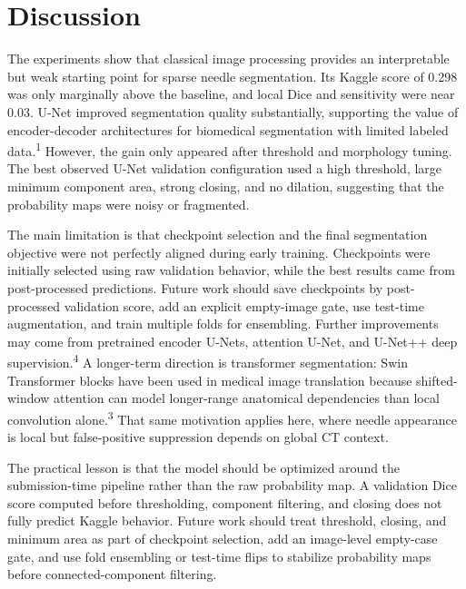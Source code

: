 \documentclass[10pt]{article}
\begin{document}
\section{Discussion}
The experiments show that classical image processing provides an interpretable but weak starting point for sparse needle segmentation. Its Kaggle score of 0.298 was only marginally above the baseline, and local Dice and sensitivity were near 0.03. U-Net improved segmentation quality substantially, supporting the value of encoder-decoder architectures for biomedical segmentation with limited labeled data.\textsuperscript{1} However, the gain only appeared after threshold and morphology tuning. The best observed U-Net validation configuration used a high threshold, large minimum component area, strong closing, and no dilation, suggesting that the probability maps were noisy or fragmented.

The main limitation is that checkpoint selection and the final segmentation objective were not perfectly aligned during early training. Checkpoints were initially selected using raw validation behavior, while the best results came from post-processed predictions. Future work should save checkpoints by post-processed validation score, add an explicit empty-image gate, use test-time augmentation, and train multiple folds for ensembling. Further improvements may come from pretrained encoder U-Nets, attention U-Net, and U-Net++ deep supervision.\textsuperscript{4} A longer-term direction is transformer segmentation: Swin Transformer blocks have been used in medical image translation because shifted-window attention can model longer-range anatomical dependencies than local convolution alone.\textsuperscript{3} That same motivation applies here, where needle appearance is local but false-positive suppression depends on global CT context.

The practical lesson is that the model should be optimized around the submission-time pipeline rather than the raw probability map. A validation Dice score computed before thresholding, component filtering, and closing does not fully predict Kaggle behavior. Future work should treat threshold, closing, and minimum area as part of checkpoint selection, add an image-level empty-case gate, and use fold ensembling or test-time flips to stabilize probability maps before connected-component filtering.
\end{document}
